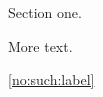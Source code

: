 \documentclass{article}
\begin{document}
Section one.

\undefinedcommand

More text.

\ref{no:such:label}
\end{document}
